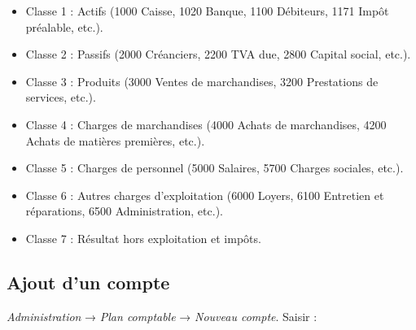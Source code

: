 \documentclass[a4paper,11pt,oneside]{article}
\begin{document}
\begin{itemize}
    \item Classe 1 : Actifs (1000 Caisse, 1020 Banque, 1100 Débiteurs, 1171 Impôt préalable, etc.).
    \item Classe 2 : Passifs (2000 Créanciers, 2200 TVA due, 2800 Capital social, etc.).
    \item Classe 3 : Produits (3000 Ventes de marchandises, 3200 Prestations de services, etc.).
    \item Classe 4 : Charges de marchandises (4000 Achats de marchandises, 4200 Achats de matières premières, etc.).
    \item Classe 5 : Charges de personnel (5000 Salaires, 5700 Charges sociales, etc.).
    \item Classe 6 : Autres charges d'exploitation (6000 Loyers, 6100 Entretien et réparations, 6500 Administration, etc.).
    \item Classe 7 : Résultat hors exploitation et impôts.
\end{itemize}

\subsection{Ajout d'un compte}\label{sec:ajout-compte}

\emph{Administration} → \emph{Plan comptable} → \emph{Nouveau compte}. Saisir :
\end{document}
